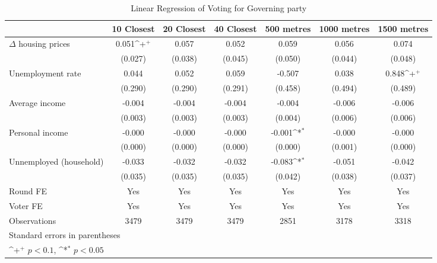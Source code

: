 \begin{table}[htbp]\centering
\def\sym#1{\ifmmode^{#1}\else\(^{#1}\)\fi}
\caption{Linear Regression of Voting for Governing party } \label{inddv}
\begin{tabular}{l*{6}{c}}
\hline\hline
                    &\multicolumn{1}{c}{10 Closest}&\multicolumn{1}{c}{20 Closest}&\multicolumn{1}{c}{40 Closest}&\multicolumn{1}{c}{500 metres}&\multicolumn{1}{c}{1000 metres}&\multicolumn{1}{c}{1500 metres}\\
\hline
$\Delta$ housing prices&       0.051\sym{+}&       0.057       &       0.052       &       0.059       &       0.056       &       0.074       \\
                    &     (0.027)       &     (0.038)       &     (0.045)       &     (0.050)       &     (0.044)       &     (0.048)       \\
[1em]
Unemployment rate   &       0.044       &       0.052       &       0.059       &      -0.507       &       0.038       &       0.848\sym{+}\\
                    &     (0.290)       &     (0.290)       &     (0.291)       &     (0.458)       &     (0.494)       &     (0.489)       \\
[1em]
Average income      &      -0.004       &      -0.004       &      -0.004       &      -0.004       &      -0.006       &      -0.006       \\
                    &     (0.003)       &     (0.003)       &     (0.003)       &     (0.004)       &     (0.006)       &     (0.006)       \\
[1em]
Personal income     &      -0.000       &      -0.000       &      -0.000       &      -0.001\sym{*}&      -0.000       &      -0.000       \\
                    &     (0.000)       &     (0.000)       &     (0.000)       &     (0.000)       &     (0.001)       &     (0.000)       \\
[1em]
Unnemployed (household)&      -0.033       &      -0.032       &      -0.032       &      -0.083\sym{*}&      -0.051       &      -0.042       \\
                    &     (0.035)       &     (0.035)       &     (0.035)       &     (0.042)       &     (0.038)       &     (0.037)       \\
[1em]
\hline  Round FE    &         Yes       &         Yes       &         Yes       &         Yes       &         Yes       &         Yes       \\
[1em]
Voter FE            &         Yes       &         Yes       &         Yes       &         Yes       &         Yes       &         Yes       \\
\hline
Observations        &        3479       &        3479       &        3479       &        2851       &        3178       &        3318       \\
\hline\hline
\multicolumn{7}{l}{\footnotesize Standard errors in parentheses}\\
\multicolumn{7}{l}{\footnotesize \sym{+} \(p<0.1\), \sym{*} \(p<0.05\)}\\
\end{tabular}
\end{table}
